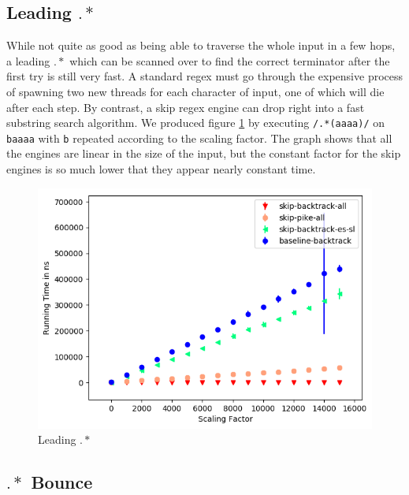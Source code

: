 \subsection{Leading $.*$}

While not quite as good as being able to traverse the whole input
in a few hops, a leading $.*$ which can be scanned over to find the
correct terminator after the first try is still very fast. A standard
regex must go through the expensive process of spawning two new threads
for each character of input, one of which will die after each step.
By contrast, a skip regex engine can drop right into a fast substring
search algorithm. We produced figure \ref{fig:leading:dotstar} by executing
\verb'/.*(aaaa)/' on \verb'baaaa' with \verb'b' repeated according
to the scaling factor. The graph shows that all the engines are linear
in the size of the input, but the constant factor for the skip engines
is so much lower that they appear nearly constant time.

\begin{figure}
\label{fig:leading:dotstar}
\caption{Leading $.*$}
\includegraphics{resources/leading-dotstar.png}
\end{figure}

\subsection{$.*$ Bounce}


